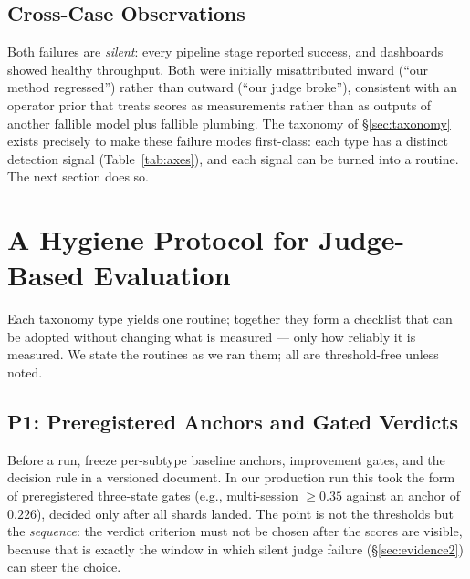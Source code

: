 \documentclass[11pt]{article}
\begin{document}
\subsection{Cross-Case Observations}
\label{sec:crosscase}

Both failures are \emph{silent}: every pipeline stage reported success, and
dashboards showed healthy throughput. Both were initially misattributed
inward (``our method regressed'') rather than outward (``our judge broke''),
consistent with an operator prior that treats scores as measurements rather
than as outputs of another fallible model plus fallible plumbing. The taxonomy
of \S\ref{sec:taxonomy} exists precisely to make these failure modes
first-class: each type has a distinct detection signal (Table~\ref{tab:axes}),
and each signal can be turned into a routine. The next section does so.

\section{A Hygiene Protocol for Judge-Based Evaluation}
\label{sec:protocol}

Each taxonomy type yields one routine; together they form a checklist that can
be adopted without changing what is measured --- only how reliably it is
measured. We state the routines as we ran them; all are threshold-free unless
noted.

\subsection{P1: Preregistered Anchors and Gated Verdicts}
Before a run, freeze per-subtype baseline anchors, improvement gates, and the
decision rule in a versioned document. In our production run this took the
form of preregistered three-state gates (e.g., multi-session $\geq 0.35$
against an anchor of $0.226$), decided only after all shards landed. The
point is not the thresholds but the \emph{sequence}: the verdict criterion
must not be chosen after the scores are visible, because that is exactly the
window in which silent judge failure (\S\ref{sec:evidence2}) can steer the
choice.
\end{document}
